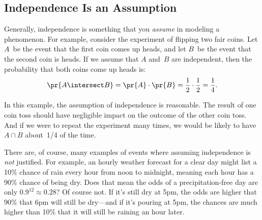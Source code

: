 \subsection{Independence Is an Assumption}

Generally, independence is something that you \emph{assume} in
modeling a phenomenon.  For example, consider the experiment of
flipping two fair coins.  Let $A$~be the event that the first coin
comes up heads, and let $B$~be the event that the second coin is
heads.  If we assume that $A$ and~$B$ are independent, then the
probability that both coins come up heads is:
%
\begin{equation*}
\pr{A \intersect B}  = \pr{A} \cdot \pr{B} %
               = \frac{1}{2} \cdot \frac{1}{2} %
               = \frac{1}{4}.
\end{equation*}

In this example, the assumption of independence is reasonable.  The
result of one coin toss should have negligible impact on the outcome
of the other coin toss.  And if we were to repeat the experiment many
times, we would be likely to have~$A \cap B$ about~1/4 of the time.

There are, of course, many examples of events where assuming
independence is \emph{not} justified.  For example, an hourly weather
forecast for a clear day might list a 10\% chance of rain every hour
from noon to midnight, meaning each hour has a 90\% chance of being
dry.  Does that mean the odds of a precipitation-free day are only
$0.9^{12} \approx 0.28$?  Of course not.  If it's still dry at 5pm,
the odds are higher that 90\% that 6pm will still be dry---and if it's
pouring at 5pm, the chances are much higher than 10\% that it will
still be raining an hour later.


\iffalse
let $C$~be the
event that tomorrow is cloudy and $R$ be the event that tomorrow is
rainy.  Perhaps $\pr{C} = 1/5$ and $\pr{R} = 1/10$ in Boston.  If
these events were independent, then we could conclude that the
probability of a rainy, cloudy day was quite small:
%
\begin{equation*}
\pr{R \intersect C} = \pr{R} \cdot \pr{C} %
               = \frac{1}{5} \cdot \frac{1}{10} %
               = \frac{1}{50}.
\end{equation*}
%
Unfortunately, these events are definitely not independent; in
particular, every rainy day is cloudy.  Thus, the probability of a
rainy, cloudy day is actually~$1/10$.
\fi

